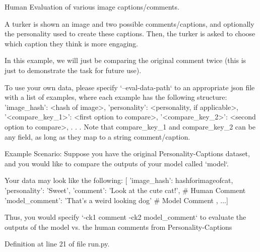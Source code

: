 \begin{DoxyVerb}Human Evaluation of various image captions/comments.

A turker is shown an image and two possible comments/captions, and
optionally the personality used to create these captions. Then, the
turker is asked to choose which caption they think is more engaging.

In this example, we will just be comparing the original comment twice
(this is just to demonstrate the task for future use).

To use your own data, please specify `--eval-data-path` to an
appropriate json file with a list of examples, where each example
has the following structure:
    {
        'image_hash': <hash of image>,
        'personality': <personality, if applicable>,
        '<compare_key_1>': <first option to compare>,
        '<compare_key_2>': <second option to compare>,
        .
        .
        .
    }
Note that compare_key_1 and compare_key_2 can be any field, as long as they
map to a string comment/caption.

Example Scenario:
    Suppose you have the original Personality-Captions dataset, and
    you would like to compare the outputs of your model called `model`.

    Your data may look like the following:
    [{
        'image_hash': hashforimageofcat,
        'personality': 'Sweet',
        'comment': 'Look at the cute cat!', # Human Comment
        'model_comment': 'That's a weird looking dog' # Model Comment
    }, ...]

    Thus, you would specify `-ck1 comment -ck2 model_comment` to evaluate
    the outputs of the model vs. the human comments from Personality-Captions
\end{DoxyVerb}
 

Definition at line 21 of file run.\+py.


